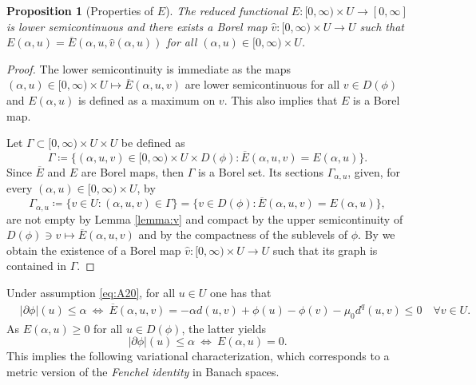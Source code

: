 \documentclass[reqno]{amsart}
\newcommand{\ove}{\overline}
\newcommand{\haz}{\widehat}
\renewcommand{\sl}{|\partial \phi|}
\newtheorem{proposition}[theorem]{Proposition}
\begin{document}
\begin{proposition}[Properties of $ E$]\label{lemma:lsc}  
The reduced functional $ E:[0,\infty) \times U \to [0,\infty]$ is lower semicontinuous and there exists a Borel map  $\haz
v: [0,\infty) \times U \to U$ such that $ E(\alpha,u) =
\ove E(\alpha,u,\haz v(\alpha,u))$ for all $(\alpha,u)\in  [0,\infty) \times U $.
\end{proposition}

\begin{proof} The lower semicontinuity is immediate as the maps
  $(\alpha,u)\in [0,\infty) \times U \mapsto \ove E(\alpha,u,v)$ are lower
  semicontinuous for all $ v \in D(\phi)$ and $ E(\alpha,u)$
  is defined as a maximum on $v$. This also implies that $ E$ is a
  Borel map.
  
  
  Let $\Gamma \subset [0,\infty) \times U \times U$ be defined as
  \[
  \Gamma\coloneqq \{ (\alpha, u,v) \in [0,\infty) \times U \times D(\phi) :
  \ove E(\alpha, u, v) =  E(\alpha, u) \}.
  \]
  Since $\ove E$ and $ E$ are Borel maps, then $\Gamma$ is a Borel
  set. Its sections $\Gamma_{\alpha, u}$, given, for every $(\alpha, u) \in [0,\infty)\times U$, by
  \[
  \Gamma_{\alpha, u} \coloneqq \{ v \in U : (\alpha, u,v) \in \Gamma \} = \{
  v \in D(\phi) : \ove E(\alpha, u,v) =  E(\alpha, u)\},
  \]
  are not empty by Lemma \ref{lemma:v} and compact by  the 
  upper semicontinuity of $D(\phi) \ni v \mapsto \ove E(\alpha, u,v)$ and
   by   the compactness of the sublevels of $\phi$. By
  \cite[Theorem 6.9.6]{Bog07} we  obtain  the existence of a Borel map $\haz v: [0,\infty) \times U \to U$ such that its graph is contained in $\Gamma$.
\end{proof} 

 Under assumption \eqref{eq:A20},  for all $u \in
    U$   one has that 
    \begin{align} &\sl(u) \leq \alpha\  \Leftrightarrow \   \ove
    E(\alpha,u,v) =  - \alpha d(u,v)+\phi(u)-\phi(v) -{ \mu_0 
        } d^q(u, v)\leq 0\quad \forall v \in
  U.\label{eq:compare}
\end{align}
As $ E(\alpha,u)\geq 0$ for all $u \in D(\phi)$, the latter yields 
  \begin{equation} \sl(u) \leq
  \alpha \ \Leftrightarrow \  E(\alpha,u)=0. \label{eq:max}
\end{equation}
  This implies the following variational
characterization, which corresponds to a metric version of the
{\it Fenchel identity} in Banach spaces.
\end{document}
